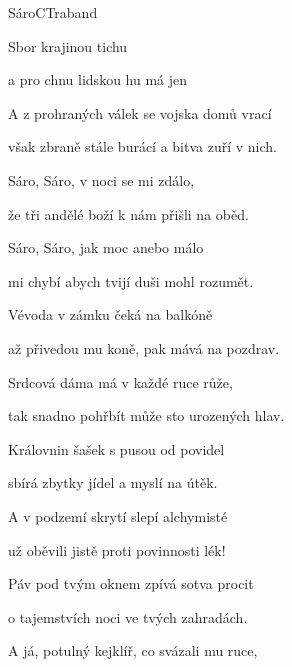 \setcounter{page}{77}
\begin{song}{Sáro}{C}{Traband}

\begin{SBVerse}

Sbor    krajinou tichu 

a pro chnu lidskou hu má jen  

A z prohraných válek se vojska domů vrací 

však zbraně stále burácí a bitva zuří v nich.

\end{SBVerse}

\begin{SBChorus}

Sáro, Sáro, v noci se mi zdálo, 

že tři andělé boží k nám přišli na oběd. 

Sáro, Sáro, jak moc anebo málo 

mi chybí abych tvijí duši mohl rozumět.

\end{SBChorus}

\begin{SBVerse}

Vévoda v zámku čeká na balkóně 

až přivedou mu koně, pak mává na pozdrav. 

Srdcová dáma má v každé ruce růže, 

tak snadno pohřbít může sto urozených hlav.

\end{SBVerse}

\begin{SBVerse}

Královnin šašek s pusou od povidel 

sbírá zbytky jídel a myslí na útěk. 

A v podzemí skrytí slepí alchymisté 

už oběvili jistě proti povinnosti lék!

\end{SBVerse}

\begin{SBVerse}

Páv pod tvým oknem zpívá sotva procit 

o tajemstvích noci ve tvých zahradách. 

A já, potulný kejklíř, co svázali mu ruce, 


\end{SBVerse}
\end{song}
